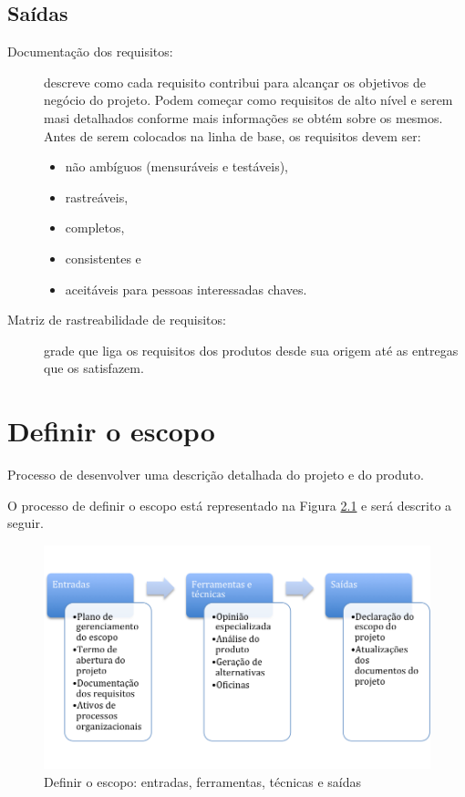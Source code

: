 \section{Saídas}

\begin{description}
	
	\item[Documentação dos requisitos:] descreve como cada requisito contribui para alcançar os objetivos de negócio do projeto. Podem começar como requisitos de alto nível e serem masi detalhados conforme mais informações se obtém sobre os mesmos. Antes de serem colocados na linha de base, os requisitos devem ser:
	
		\begin{itemize}
			\item não ambíguos (mensuráveis e testáveis),
			\item rastreáveis,
			\item completos,
			\item consistentes e
			\item aceitáveis para pessoas interessadas chaves.
		\end{itemize}
	
	\item[Matriz de rastreabilidade de requisitos:] grade que liga os requisitos dos produtos desde sua origem até as entregas que os satisfazem.
	
\end{description}

\chapter{Definir o escopo}

Processo de desenvolver uma descrição detalhada do projeto e do produto. 

O processo de definir o escopo está representado na Figura \ref{fig:escopo:def:efts} e será descrito a seguir.

\begin{figure}[!h]
	\centering
	\includegraphics[scale=0.5]{Figuras/escopo_efts_definir.png}
	\caption{Definir o escopo: entradas, ferramentas, técnicas e saídas}
	\label{fig:escopo:def:efts}
\end{figure}

